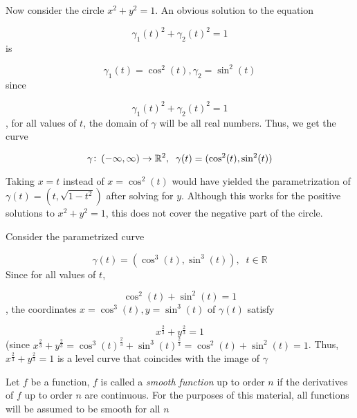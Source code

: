 \begin{example}
		Now consider the circle \(x^{2} + y^{2} = 1\). An obvious solution to the equation

\[
\gamma_{1}(t)^{2} + \gamma_{2}(t)^{2} = 1
\]
		is

\[
\gamma_{1}(t) = \cos^{2}(t), \gamma_{2} = \sin^{2}(t)
\]
		since

\[
\gamma_{1}(t)^{2} + \gamma_{2}(t)^{2} = 1
\]
, for all values of \(t\), the domain of \(\gamma\) will be all real numbers. Thus, we get the curve

\[
\gamma \colon \intoo{-\infty, \infty} \rightarrow \mathbb{R}^{2}, \;\; \gamma(t) = (\cos^{2}(t), \sin^{2}(t))
\]

\begin{remark}
			Taking \(x = t\) instead of \(x = \cos^{2}(t)\) would have yielded the parametrization of \(\gamma(t) = (t, \sqrt{1 - t^{2}})\) after solving for \(y\). Although this works for the positive solutions to \(x^{2} + y^{2} = 1\), this does not cover the negative part of the circle.

\end{remark}

\end{example}


\begin{example}
		Consider the parametrized curve

\[
\gamma(t) = (\cos^{3}(t), \sin^{3}(t)), \;\; t \in \mathbb{R}
\]
		Since for all values of \(t\),

\[
\cos^{2}(t) + \sin^{2}(t) = 1
\]
, the coordinates \(x = \cos^{3}(t), y = \sin^{3}(t)\) of \(\gamma(t)\) satisfy

\[
x^{\frac{2}{3}} + y^{\frac{2}{3}} = 1
\]
		(since \(x^{\frac{2}{3}} + y^{\frac{2}{3}} = \cos^{3}(t)^{\frac{2}{3}} + \sin^{3}(t)^{\frac{2}{3}} = \cos^{2}(t) + \sin^{2}(t) = 1\). Thus, \(x^{\frac{2}{3}} + y^{\frac{2}{3}} = 1\) is a level curve that coincides with the image of \(\gamma\)

\end{example}


\begin{definition}
		Let \(f\) be a function, \(f\) is called a \textit{smooth function} up to order \(n\) if the derivatives of \(f\) up to order \(n\) are continuous. For the purposes of this material, all functions will be assumed to be smooth for all \(n\)

\end{definition}


